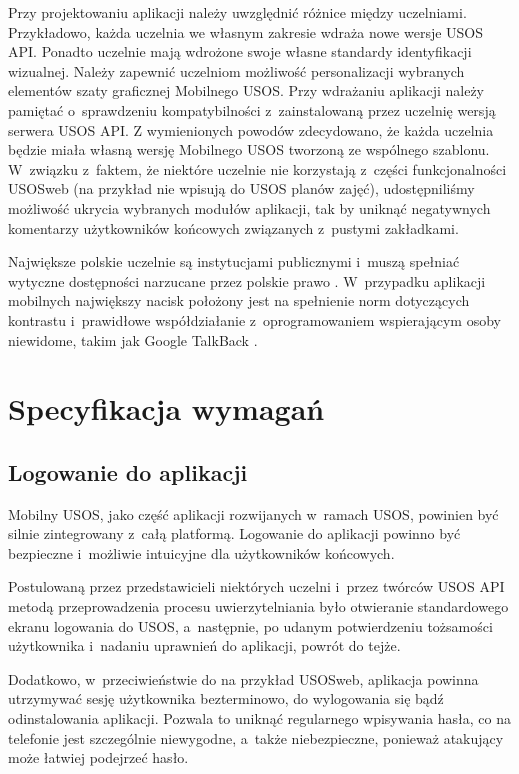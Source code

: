 \documentclass{pracamgr}
\begin{document}
Przy projektowaniu aplikacji należy uwzględnić różnice między uczelniami.
Przykładowo, każda uczelnia we własnym zakresie wdraża nowe wersje USOS API.
Ponadto uczelnie mają wdrożone swoje własne standardy identyfikacji wizualnej.
Należy zapewnić uczelniom możliwość personalizacji wybranych elementów szaty
graficznej Mobilnego USOS. Przy wdrażaniu aplikacji należy pamiętać o~sprawdzeniu kompatybilności z~zainstalowaną przez uczelnię wersją serwera USOS API.
Z wymienionych powodów zdecydowano, że każda uczelnia będzie miała własną
wersję Mobilnego USOS tworzoną ze wspólnego szablonu. W~związku z~faktem, że
niektóre uczelnie nie korzystają z~części funkcjonalności USOSweb (na przykład nie
wpisują do USOS planów zajęć), udostępniliśmy możliwość ukrycia wybranych modułów aplikacji,
tak by uniknąć negatywnych komentarzy użytkowników końcowych związanych z~pustymi zakładkami.

Największe polskie uczelnie są instytucjami publicznymi i~muszą spełniać wytyczne
dostępności narzucane przez polskie prawo \cite{uodc}. W~przypadku aplikacji mobilnych
największy nacisk położony jest na spełnienie norm dotyczących kontrastu i~prawidłowe
współdziałanie z~oprogramowaniem wspierającym osoby niewidome, takim jak Google
TalkBack \cite{talkback}.

\chapter{Specyfikacja wymagań}

\section{Logowanie do aplikacji}

Mobilny USOS, jako część aplikacji rozwijanych w~ramach USOS, powinien być silnie 
zintegrowany z~całą platformą. Logowanie do aplikacji powinno być bezpieczne i~możliwie
intuicyjne dla użytkowników końcowych.

Postulowaną przez przedstawicieli niektórych uczelni i~przez twórców USOS API
metodą przeprowadzenia procesu uwierzytelniania było otwieranie standardowego ekranu
logowania do USOS, a~następnie, po udanym potwierdzeniu tożsamości użytkownika
i~nadaniu uprawnień do aplikacji, powrót do tejże.

Dodatkowo, w~przeciwieństwie do na przykład USOSweb, aplikacja powinna utrzymywać
sesję użytkownika bezterminowo, do wylogowania się bądź odinstalowania aplikacji.
Pozwala to uniknąć regularnego wpisywania hasła, co na telefonie jest szczególnie
niewygodne, a~także niebezpieczne, ponieważ atakujący może łatwiej podejrzeć hasło.
\end{document}
